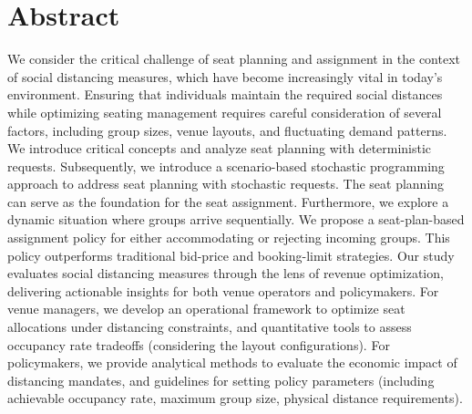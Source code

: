 
\section*{Abstract}
We consider the critical challenge of seat planning and assignment in the context of social distancing measures, which have become increasingly vital in today's environment. Ensuring that individuals maintain the required social distances while optimizing seating management requires careful consideration of several factors, including group sizes, venue layouts, and fluctuating demand patterns. We introduce critical concepts and analyze seat planning with deterministic requests. Subsequently, we introduce a scenario-based stochastic programming approach to address seat planning with stochastic requests. The seat planning can serve as the foundation for the seat assignment. Furthermore, we explore a dynamic situation where groups arrive sequentially. We propose a seat-plan-based assignment policy for either accommodating or rejecting incoming groups. This policy outperforms traditional bid-price and booking-limit strategies. Our study evaluates social distancing measures through the lens of revenue optimization, delivering actionable insights for both venue operators and policymakers. For venue managers, we develop an operational framework to optimize seat allocations under distancing constraints, and quantitative tools to assess occupancy rate tradeoffs (considering the layout configurations). For policymakers, we provide analytical methods to evaluate the economic impact of distancing mandates, and guidelines for setting policy parameters (including achievable occupancy rate, maximum group size, physical distance requirements).








